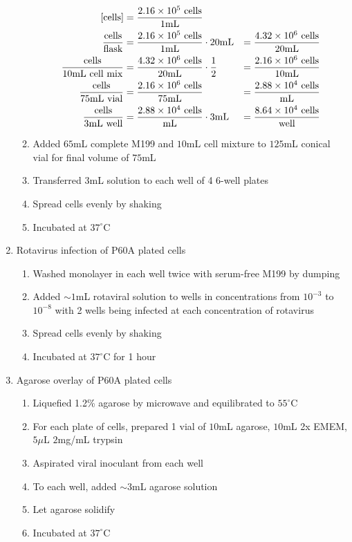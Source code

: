 \begin{enumerate}
\begin{enumerate}
				\begin{align*}
				\text{[cells]} &= \frac{2.16\times 10^{5}\text{ cells}}{1\text{mL}} \\
				\frac{\text{cells}}{\text{flask}} &= \frac{2.16\times 10^{5}\text{ cells}}{1\text{mL}} \cdot 20\text{mL} &= \frac{4.32\times 10^{6}\text{ cells}}{20\text{mL}}\\
				\frac{\text{cells}}{10\text{mL cell mix}} &= \frac{4.32\times 10^{6}\text{ cells}}{20\text{mL}}\cdot \frac{1}{2} &= \frac{2.16\times 10^{6}\text{ cells}}{10\text{mL}}\\
				\frac{\text{cells}}{75\text{mL vial}} &= \frac{2.16\times 10^{6}\text{ cells}}{75\text{mL}} &= \frac{2.88\times 10^{4}\text{ cells}}{\text{mL}}\\
				\frac{\text{cells}}{3\text{mL well}} &= \frac{2.88\times 10^{4}\text{ cells}}{\text{mL}} \cdot 3\text{mL} &= \frac{8.64\times 10^{4}\text{ cells}}{\text{well}}\\
				\end{align*}
			\item Added $65$mL complete M199 and $10$mL cell mixture to $125$mL conical vial for final volume of $75$mL
			\item Transferred $3$mL solution to each well of 4 6-well plates
			\item Spread cells evenly by shaking
			\item Incubated at $37^{\circ}$C
		\end{enumerate}
	\item Rotavirus infection of P60A plated cells
		\begin{enumerate}
			\item Washed monolayer in each well twice with serum-free M199 by dumping
			\item Added $\sim1$mL rotaviral solution to wells in concentrations from $10^{-3}$ to $10^{-8}$ with 2 wells being infected at each concentration of rotavirus
			\item Spread cells evenly by shaking
			\item Incubated at $37^{\circ}$C for 1 hour
		\end{enumerate}
	\item Agarose overlay of P60A plated cells
		\begin{enumerate}
			\item Liquefied 1.2\% agarose by microwave and equilibrated to $55^{\circ}$C
			\item For each plate of cells, prepared 1 vial of $10$mL agarose, $10$mL 2x EMEM, $5\mu$L $2$mg/mL trypsin
			\item Aspirated viral inoculant from each well
			\item To each well, added $\sim3$mL agarose solution
			\item Let agarose solidify
			\item Incubated at $37^{\circ}$C
		\end{enumerate}
\end{enumerate}

